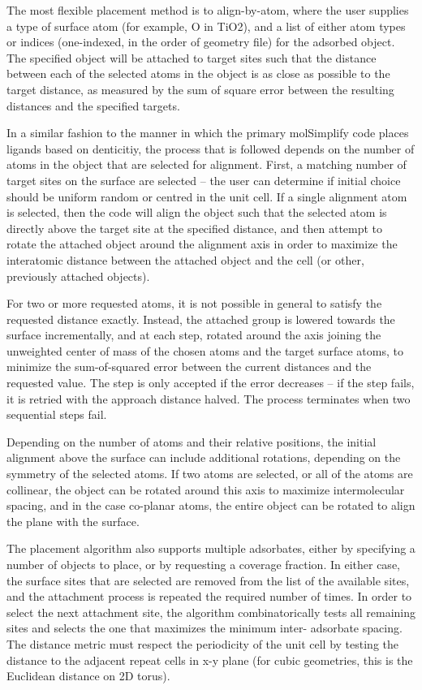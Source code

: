 The most flexible placement method is to align-by-atom, where the user supplies a type of surface atom (for example, O in TiO2), and a list of either atom types or indices (one-indexed, in the order of geometry file) for the adsorbed object. The specified object will be attached to target sites such that the distance between each of the selected atoms in the object is as close as possible to the target distance, as measured by the sum of square error between the resulting distances and the specified targets.

In a similar fashion to the manner in which the primary molSimplify code places ligands based on denticitiy, the process that is followed depends on the number of atoms in the object that are selected for alignment. First, a matching number of target sites on the surface are selected – the user can determine if initial choice should be uniform random or centred in the unit cell. If a single alignment atom is selected, then the code will align the object such that the selected atom is directly above the target site at the specified distance, and then attempt to rotate the attached object around the alignment axis in order to maximize the interatomic distance between the attached object and the cell (or other, previously attached objects).

For two or more requested atoms, it is not possible in general to satisfy the requested distance exactly. Instead, the attached group is lowered towards the surface incrementally, and at each step, rotated around the axis joining the unweighted center of mass of the chosen atoms and the target surface atoms, to minimize the sum-of-squared error between the current distances and the requested value. The step is only accepted if the error decreases – if the step fails, it is retried with the approach distance halved. The process terminates when two sequential steps fail.

Depending on the number of atoms and their relative positions, the initial alignment above the surface can include additional rotations, depending on the symmetry of the selected atoms. If two atoms are selected, or all of the atoms are collinear, the object can be rotated around this axis to maximize intermolecular spacing, and in the case co-planar atoms, the entire object can be rotated to align the plane with the surface.
 
The placement algorithm also supports multiple adsorbates, either by specifying a number of objects to place, or by requesting a coverage fraction. In either case, the surface sites that are selected are removed from the list of the available sites, and the attachment process is repeated the required number of times. In order to select the next attachment site, the algorithm combinatorically tests all remaining sites and selects the one that maximizes the minimum inter- adsorbate spacing. The distance metric must respect the periodicity of the unit cell by testing the distance to the adjacent repeat cells in x-y plane (for cubic geometries, this is the Euclidean distance on 2D torus). 
